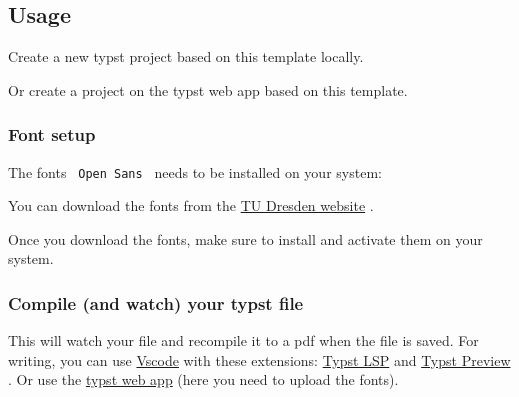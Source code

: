 \subsection{Usage}\label{usage}

Create a new typst project based on this template locally.

\begin{Shaded}
\begin{Highlighting}[]
\end{Highlighting}
\end{Shaded}

Or create a project on the typst web app based on this template.

\subsubsection{Font setup}\label{font-setup}

The fonts \texttt{\ Open\ Sans\ } needs to be installed on your system:

You can download the fonts from the
\href{https://tu-dresden.de/intern/services-und-hilfe/ressourcen/dateien/kommunizieren_und_publizieren/corporate-design/cd-elemente/schrift-tud-open-sans}{TU
Dresden website} .

Once you download the fonts, make sure to install and activate them on
your system.

\subsubsection{Compile (and watch) your typst
file}\label{compile-and-watch-your-typst-file}

\begin{Shaded}
\begin{Highlighting}[]
\end{Highlighting}
\end{Shaded}

This will watch your file and recompile it to a pdf when the file is
saved. For writing, you can use
\href{https://code.visualstudio.com/}{Vscode} with these extensions:
\href{https://marketplace.visualstudio.com/items?itemName=nvarner.typst-lsp}{Typst
LSP} and
\href{https://marketplace.visualstudio.com/items?itemName=mgt19937.typst-preview}{Typst
Preview} . Or use the \href{https://typst.app/}{typst web app} (here you
need to upload the fonts).

